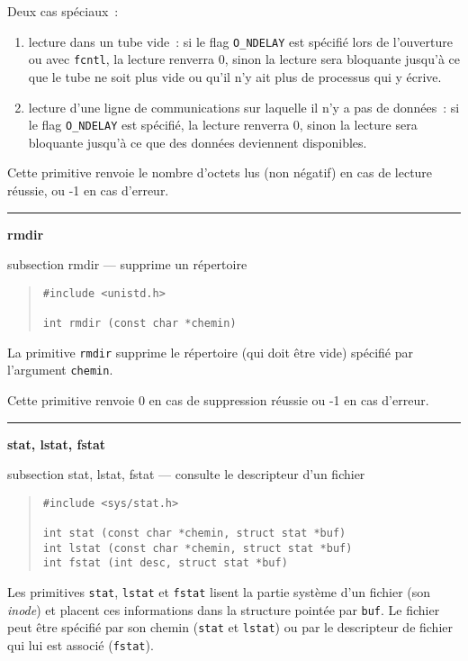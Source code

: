\documentclass [twoside] {report}
\newcommand {\primitive} [1]
    {
	\phantomsection
	{\large \textbf {#1}}
	\addcontentsline {toc} {subsection} {#1}
    }
\newcommand {\separation}
    {
	\vspace {5mm}
	\nopagebreak
	\hrule
    }
\begin{document}
Deux cas spéciaux~:

\begin {enumerate}
    \item lecture dans un tube vide~: si le flag \texttt {O\_NDELAY}
	est spécifié lors de l'ouverture ou avec \texttt {fcntl},
	la lecture renverra 0, sinon la lecture
	sera bloquante jusqu'à ce que le tube ne soit plus
	vide ou qu'il n'y ait plus de processus qui y écrive.
    \item lecture d'une ligne de communications sur
	laquelle il n'y a pas de données~: si le flag \texttt {O\_NDELAY}
	est spécifié, la lecture renverra 0, sinon la lecture
	sera bloquante jusqu'à ce que des données
	deviennent disponibles.
\end {enumerate}

Cette primitive renvoie le nombre d'octets lus
(non négatif) en cas de lecture
réussie, ou -1 en cas d'erreur.




\separation
\primitive {rmdir} --- supprime un répertoire

\begin {quote}
\begin {verbatim}
#include <unistd.h>

int rmdir (const char *chemin)
\end{verbatim}
\end {quote}

La primitive \texttt {rmdir} supprime le répertoire (qui doit être vide)
spécifié par l'argument \texttt {chemin}.

Cette primitive renvoie 0 en cas de suppression réussie
ou -1 en cas d'erreur.




\separation
\primitive {stat, lstat, fstat} --- consulte le descripteur d'un fichier
    \label {stat}

\begin {quote}
\begin {verbatim}
#include <sys/stat.h>

int stat (const char *chemin, struct stat *buf)
int lstat (const char *chemin, struct stat *buf)
int fstat (int desc, struct stat *buf)
\end{verbatim}
\end {quote}

Les primitives \texttt {stat}, \texttt {lstat} et \texttt {fstat} lisent la partie
système d'un fichier (son \textit {inode}) et placent ces informations dans
la structure pointée par \texttt {buf}. Le fichier peut être spécifié
par son chemin (\texttt {stat} et \texttt {lstat}) ou par le descripteur
de fichier qui lui est associé (\texttt {fstat}).
\end{document}
